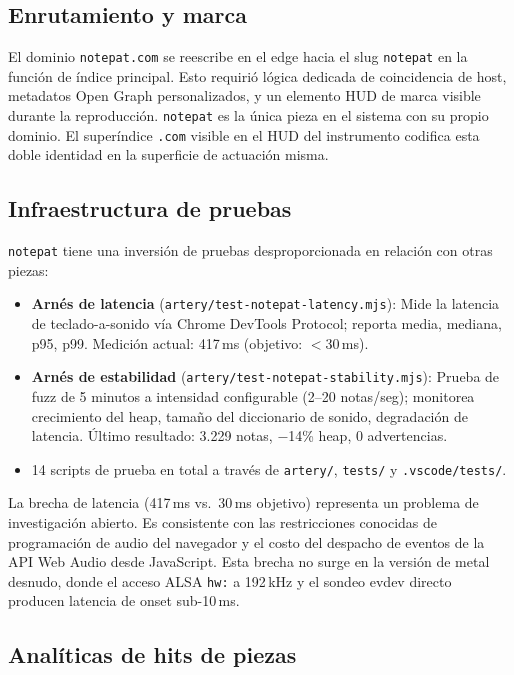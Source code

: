 \documentclass[10pt,letterpaper,twocolumn]{article}
\begin{document}
\subsection{Enrutamiento y marca}

El dominio \texttt{notepat.com} se reescribe en el edge hacia el slug \texttt{notepat} en la función de índice principal. Esto requirió lógica dedicada de coincidencia de host, metadatos Open Graph personalizados, y un elemento HUD de marca visible durante la reproducción. \texttt{notepat} es la única pieza en el sistema con su propio dominio. El superíndice \texttt{.com} visible en el HUD del instrumento codifica esta doble identidad en la superficie de actuación misma.

\subsection{Infraestructura de pruebas}

\texttt{notepat} tiene una inversión de pruebas desproporcionada en relación con otras piezas:

\begin{itemize}
  \item \textbf{Arnés de latencia} (\texttt{artery/test-notepat-latency.mjs}): Mide la latencia de teclado-a-sonido vía Chrome DevTools Protocol; reporta media, mediana, p95, p99. Medición actual: 417\,ms (objetivo: $<$30\,ms).
  \item \textbf{Arnés de estabilidad} (\texttt{artery/test-notepat-stability.mjs}): Prueba de fuzz de 5 minutos a intensidad configurable (2--20 notas/seg); monitorea crecimiento del heap, tamaño del diccionario de sonido, degradación de latencia. Último resultado: 3.229 notas, $-$14\% heap, 0 advertencias.
  \item 14 scripts de prueba en total a través de \texttt{artery/}, \texttt{tests/} y \texttt{.vscode/tests/}.
\end{itemize}

La brecha de latencia (417\,ms vs.\ 30\,ms objetivo) representa un problema de investigación abierto. Es consistente con las restricciones conocidas de programación de audio del navegador y el costo del despacho de eventos de la API Web Audio desde JavaScript. Esta brecha no surge en la versión de metal desnudo, donde el acceso ALSA \texttt{hw:} a 192\,kHz y el sondeo evdev directo producen latencia de onset sub-10\,ms.

\subsection{Analíticas de hits de piezas}
\end{document}
